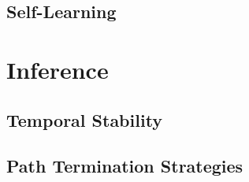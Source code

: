 \subsection{Self-Learning}

\section{Inference}

\subsection{Temporal Stability}

\subsection{Path Termination Strategies}

